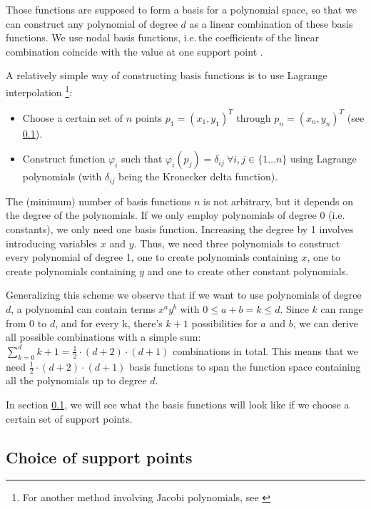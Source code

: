 \documentclass[a4paper, twoside]{article}
\renewcommand{\phi}{\varphi}
\begin{document}
Those functions are supposed to form a basis for a polynomial space, so that we can construct any polynomial of degree $d$ as a linear combination of these basis functions. We use nodal basis functions, i.e.\,the coefficients of the linear combination coincide with the value at one support point \cite{boeck08discontinuous-galerkin-verfahren}.

A relatively simple way of constructing basis functions is to use Lagrange interpolation
\footnote{For another method involving Jacobi polynomials, see \cite{castro07high-order-ader-fv-dg-numerical-methods, hesthaven2007nodal}}:

\begin{itemize}
\item Choose a certain set of $n$ points $p_1=\left( x_1,y_1 \right)^T$ through $p_n=\left( x_n,y_n \right)^T$ (see \ref{sec:choice-support-points}).
\item Construct function $\phi_i$ such that $\phi_i(p_j) = \delta_{ij} \  \forall i,j \in \{1 \dots n\}$ using Lagrange polynomials (with $\delta_{ij}$ being the Kronecker delta function).
\end{itemize}

The (minimum) number of basis functions $n$ is not arbitrary, but it depends on the degree of the polynomials. If we only employ polynomials of degree 0 (i.e.\,constants), we only need one basis function. Increasing the degree by 1 involves introducing variables $x$ and $y$. Thus, we need three polynomials to construct every polynomial of degree 1, one to create polynomials containing $x$, one to create polynomials containing $y$ and one to create other constant polynomials.

Generalizing this scheme we observe that if we want to use polynomials of degree $d$, a polynomial can contain terms $x^a y^b$ with $0 \leq a+b = k \leq d$.
Since $k$ can range from 0 to $d$, and for every k, there's $k+1$ possibilities for $a$ and $b$, we can derive all possible combinations with a simple sum: $\sum_{k = 0}^d k+1 = \frac{1}{2} \cdot (d+2) \cdot (d+1)$ combinations in total.
This means that we need $\frac{1}{2} \cdot (d+2) \cdot (d+1)$ basis functions to span the function space containing all the polynomials up to degree $d$.

In section \ref{sec:choice-support-points}, we will see what the basis functions will look like if we choose a certain set of support points.

\subsection{Choice of support points}
\label{sec:choice-support-points}
\end{document}
